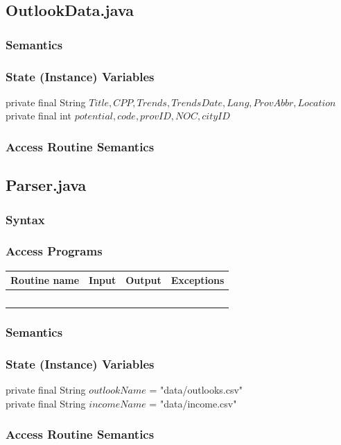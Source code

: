 \documentclass[12pt,fleqn]{article}
\begin{document}
\subsection*{OutlookData.java}\label{poutlookd}

\subsubsection*{Semantics}
\subsubsection*{State (Instance) Variables}
	private final String $Title,CPP,Trends,TrendsDate,Lang,ProvAbbr,Location$\\
	private final int $potential,code,provID, NOC, cityID$
\subsubsection*{Access Routine Semantics}


\subsection*{Parser.java}\label{pparser}
\subsubsection* {Syntax}

\subsubsection* {Access Programs}
\begin{tabular}{| l | l | l | l |}
\hline
\textbf{Routine name} & \textbf{Input} & \textbf{Output} & \textbf{Exceptions}\\
\hline
~ & ~ & ~ & ~\\
\hline
\end{tabular}

\subsubsection*{Semantics}
\subsubsection*{State (Instance) Variables}
	private final String $outlookName$ = "data/outlooks.csv"\\
	private final String $incomeName$ = "data/income.csv"
\subsubsection*{Access Routine Semantics}
\end{document}
